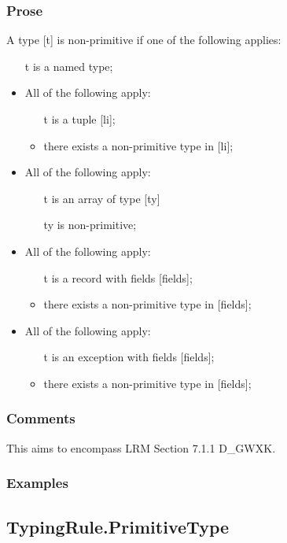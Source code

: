 \documentclass{book}
\begin{document}
    \subsubsection{Prose} 
    A type [t] is non-primitive if one of the following applies:
    \begin{itemize}
    \item  [t] is a named type;
    \item  All of the following apply:
      \begin{itemize}
      \item  [t] is a tuple [li];
      \item  there exists a non-primitive type in [li];
      \end{itemize}
    \item  All of the following apply:
      \begin{itemize}
      \item  [t] is an array of type [ty]
      \item  [ty] is non-primitive; 
      \end{itemize}
    \item  All of the following apply:
      \begin{itemize}
      \item  [t] is a record with fields [fields];
      \item  there exists a non-primitive type in [fields];
      \end{itemize}
    \item  All of the following apply:
      \begin{itemize}
      \item  [t] is an exception with fields [fields];
      \item  there exists a non-primitive type in [fields];
      \end{itemize}
    \end{itemize}

    \subsubsection{Comments}
    This aims to encompass LRM Section 7.1.1 D\_GWXK.

    \subsubsection{Examples}

\subsection{TypingRule.PrimitiveType}
\end{document}

